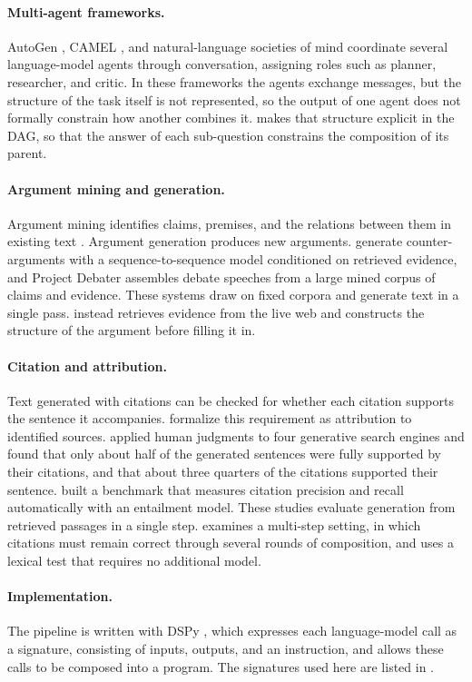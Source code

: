\paragraph{Multi-agent frameworks.}
AutoGen \citep{wu2023autogen}, CAMEL \citep{li2023camel}, and natural-language societies of mind \citep{zhuge2023mindstorms} coordinate several language-model agents through conversation, assigning roles such as planner, researcher, and critic. In these frameworks the agents exchange messages, but the structure of the task itself is not represented, so the output of one agent does not formally constrain how another combines it. \sys{} makes that structure explicit in the DAG, so that the answer of each sub-question constrains the composition of its parent.

\paragraph{Argument mining and generation.}
Argument mining identifies claims, premises, and the relations between them in existing text \citep{lawrence2020argmining}. Argument generation produces new arguments. \citet{hua2018argument} generate counter-arguments with a sequence-to-sequence model conditioned on retrieved evidence, and Project Debater \citep{slonim2021debater} assembles debate speeches from a large mined corpus of claims and evidence. These systems draw on fixed corpora and generate text in a single pass. \sys{} instead retrieves evidence from the live web and constructs the structure of the argument before filling it in.

\paragraph{Citation and attribution.}
Text generated with citations can be checked for whether each citation supports the sentence it accompanies. \citet{rashkin2023ais} formalize this requirement as attribution to identified sources. \citet{liu2023verifiability} applied human judgments to four generative search engines and found that only about half of the generated sentences were fully supported by their citations, and that about three quarters of the citations supported their sentence. \citet{gao2023alce} built a benchmark that measures citation precision and recall automatically with an entailment model. These studies evaluate generation from retrieved passages in a single step.  examines a multi-step setting, in which citations must remain correct through several rounds of composition, and uses a lexical test that requires no additional model.

\paragraph{Implementation.}
The pipeline is written with DSPy \citep{khattab2024dspy}, which expresses each language-model call as a signature, consisting of inputs, outputs, and an instruction, and allows these calls to be composed into a program. The signatures used here are listed in .
